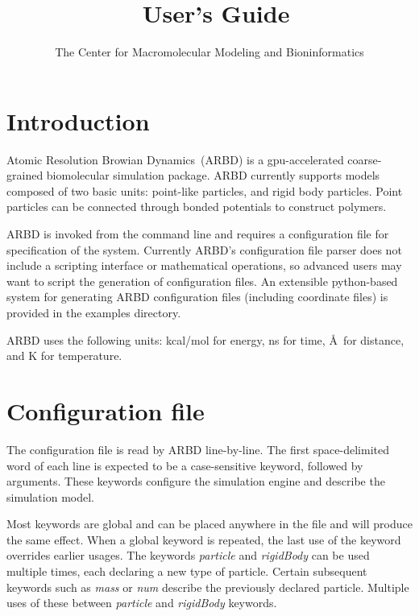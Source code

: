 \documentclass[10pt]{article}
\title{\Large \ARBDFull\ User's Guide}
\author{\normalsize The Center for Macromolecular Modeling and Bioninformatics}
\newcommand{\ARBDFull}{Atomic Resolution Browian Dynamics}
\begin{document}
\maketitle


\section{Introduction}

\ARBDFull\ (ARBD) is a gpu-accelerated coarse-grained biomolecular simulation package.
ARBD currently supports models composed of two basic units: point-like particles, and rigid body particles.
Point particles can be connected through bonded potentials to construct polymers.


ARBD is invoked from the command line and requires a configuration file for specification of the system.
Currently ARBD's configuration file parser does not include a scripting interface or mathematical operations, so advanced users may want to script the generation of configuration files.
An extensible python-based system for generating ARBD configuration files (including coordinate files) is provided in the examples directory.


ARBD uses the following units: kcal/mol for energy, ns for time, \AA\ for distance, and K for temperature.


\section{Configuration file}
The configuration file is read by ARBD line-by-line. 
The first space-delimited word of each line is expected to be a case-sensitive keyword, followed by arguments.
These keywords configure the simulation engine and describe the simulation model.

Most keywords are global and can be placed anywhere in the file and will produce the same effect.
When a global keyword is repeated, the last use of the keyword overrides earlier usages.
The keywords \textit{particle} and \textit{rigidBody} can be used multiple times, each declaring a new type of particle.
Certain subsequent keywords such as \textit{mass} or \textit{num} describe the previously declared particle.
Multiple uses of these between \textit{particle} and \textit{rigidBody} keywords.
\end{document}
